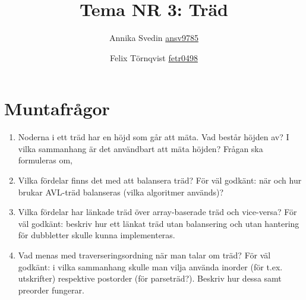 \documentclass[a5paper,10pt,oneside]{article}
\title{Tema NR 3: Träd}
\author{Annika Svedin \url{ansv9785} \and Felix Törnqvist \url{fetr0498}}
\begin{document}
\maketitle

\section*{Muntafrågor}

\begin{enumerate}

\item

Noderna i ett träd har en höjd som går att mäta. Vad består höjden av? I vilka sammanhang är det användbart att mäta höjden?
Frågan ska formuleras om,


\item
Vilka fördelar finns det med att balansera träd? För väl godkänt: när och hur brukar AVL-träd balanseras (vilka algoritmer används)?

\item
Vilka fördelar har länkade träd över array-baserade träd och vice-versa? För väl godkänt: beskriv hur ett länkat träd utan balansering och utan hantering för dubbletter skulle kunna implementeras.

\item
Vad menas med traverseringsordning när man talar om träd? För väl godkänt: i vilka sammanhang skulle man vilja använda inorder (för t.ex. utskrifter) respektive postorder (för parseträd?). Beskriv hur dessa samt preorder fungerar.

\end{enumerate}
\end{document}
